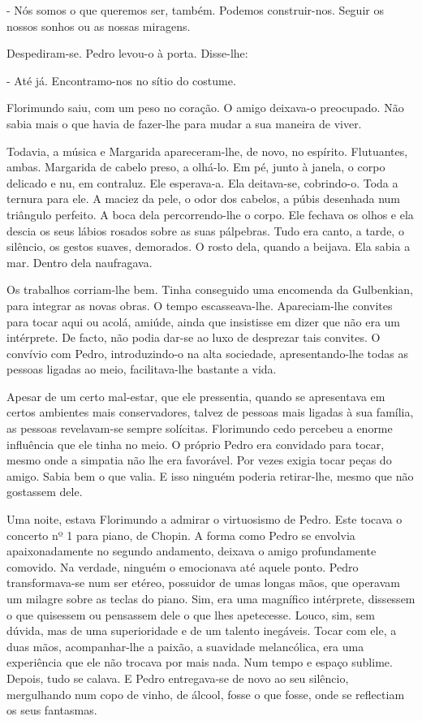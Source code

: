 - Nós somos o que queremos ser, também. Podemos construir-nos. Seguir os
nossos sonhos ou as nossas miragens.

Despediram-se. Pedro levou-o à porta. Disse-lhe:

- Até já. Encontramo-nos no sítio do costume.

Florimundo saiu, com um peso no coração. O amigo deixava-o preocupado.
Não sabia mais o que havia de fazer-lhe para mudar a sua maneira de
viver.

Todavia, a música e Margarida apareceram-lhe, de novo, no espírito.
Flutuantes, ambas. Margarida de cabelo preso, a olhá-lo. Em pé, junto à
janela, o corpo delicado e nu, em contraluz. Ele esperava-a. Ela
deitava-se, cobrindo-o. Toda a ternura para ele. A maciez da pele, o
odor dos cabelos, a púbis desenhada num triângulo perfeito. A boca dela
percorrendo-lhe o corpo. Ele fechava os olhos e ela descia os seus
lábios rosados sobre as suas pálpebras. Tudo era canto, a tarde, o
silêncio, os gestos suaves, demorados. O rosto dela, quando a beijava.
Ela sabia a mar. Dentro dela naufragava.

Os trabalhos corriam-lhe bem. Tinha conseguido uma encomenda da
Gulbenkian, para integrar as novas obras. O tempo escasseava-lhe.
Apareciam-lhe convites para tocar aqui ou acolá, amiúde, ainda que
insistisse em dizer que não era um intérprete. De facto, não podia
dar-se ao luxo de desprezar tais convites. O convívio com Pedro,
introduzindo-o na alta sociedade, apresentando-lhe todas as pessoas
ligadas ao meio, facilitava-lhe bastante a vida.

Apesar de um certo mal-estar, que ele pressentia, quando se apresentava
em certos ambientes mais conservadores, talvez de pessoas mais ligadas à
sua família, as pessoas revelavam-se sempre solícitas. Florimundo cedo
percebeu a enorme influência que ele tinha no meio. O próprio Pedro era
convidado para tocar, mesmo onde a simpatia não lhe era favorável. Por
vezes exigia tocar peças do amigo. Sabia bem o que valia. E isso ninguém
poderia retirar-lhe, mesmo que não gostassem dele.

Uma noite, estava Florimundo a admirar o virtuosismo de Pedro. Este
tocava o concerto nº 1 para piano, de Chopin. A forma como Pedro se
envolvia apaixonadamente no segundo andamento, deixava o amigo
profundamente comovido. Na verdade, ninguém o emocionava até aquele
ponto. Pedro transformava-se num ser etéreo, possuidor de umas longas
mãos, que operavam um milagre sobre as teclas do piano. Sim, era uma
magnífico intérprete, dissessem o que quisessem ou pensassem dele o que
lhes apetecesse. Louco, sim, sem dúvida, mas de uma superioridade e de
um talento inegáveis. Tocar com ele, a duas mãos, acompanhar-lhe a
paixão, a suavidade melancólica, era uma experiência que ele não trocava
por mais nada. Num tempo e espaço sublime. Depois, tudo se calava. E
Pedro entregava-se de novo ao seu silêncio, mergulhando num copo de
vinho, de álcool, fosse o que fosse, onde se reflectiam os seus
fantasmas.

